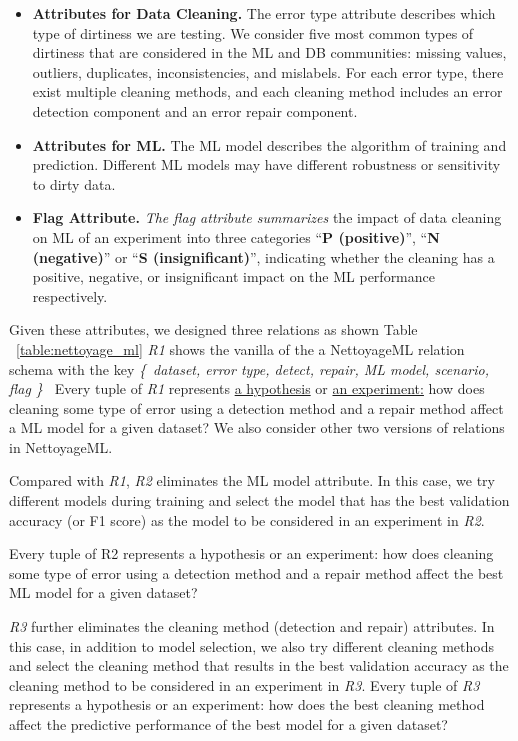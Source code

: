 \begin{itemize}
	\item {
	\textbf{Attributes for Data Cleaning.}	
		The error type attribute describes
		which type of dirtiness we are testing. We consider five most
		common types of dirtiness that are considered in the ML and
		DB communities: missing values, outliers, duplicates, inconsistencies, and mislabels. For each error type, there exist multiple
		cleaning methods, and each cleaning method includes an error
		detection component and an error repair component.
	}
\item {
	\textbf{Attributes for ML.}	
	The ML model describes the algorithm of
	training and prediction. Different ML models may have different
	robustness or sensitivity to dirty data.
}
\item {
	\textbf{Flag Attribute.}	
	\textit{The flag attribute summarizes } the impact of data cleaning on ML of an experiment into three categories “\textbf{P (positive)}”, “\textbf{N (negative)}” 
	or “\textbf{S (insignificant)}”, indicating whether
	the cleaning has a positive, negative, or insignificant impact on
	the ML performance respectively.
}
\end{itemize}

Given these attributes, we designed three relations as shown Table ~\ref{table:nettoyage_ml}
\textit{R1} shows the vanilla of the a NettoyageML relation schema with the key 
\textit{ \{\ dataset, error type, detect, repair, ML model, scenario, flag \}\ }
Every tuple of \textit{R1} represents \underline{a hypothesis} or \underline{an experiment:}
how does cleaning some type of error using a detection method and a repair method affect a ML model for a given dataset?
We also consider other two versions of relations in NettoyageML. 

Compared with \textit{R1}, \textit{R2} eliminates the ML model attribute. In this case,
we try different models during training and select the model that
has the best validation accuracy (or F1 score) as the model to be
considered in an experiment in \textit{R2}. 

Every tuple of R2 represents a hypothesis or an experiment: how does cleaning some type of error using a detection method and a repair method affect the best
ML model for a given dataset? 

\textit{R3} further eliminates the cleaning method (detection and repair) attributes. In this case, in addition
to model selection, we also try different cleaning methods and select the cleaning method that results in the best validation accuracy as the cleaning method to be considered in an experiment in \textit{R3}.
Every tuple of \textit{R3} represents a hypothesis or an experiment: how
does the best cleaning method affect the predictive performance of
the best model for a given dataset?

